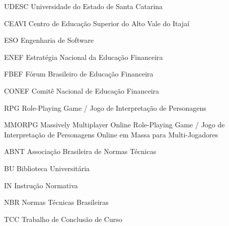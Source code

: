 
\listoffigures*
\cleardoublepage



\listoftables*
\cleardoublepage

\begin{siglas}
	\item[UDESC] Universidade do Estado de Santa Catarina
	\item[CEAVI] Centro de Educação Superior do Alto Vale do Itajaí
	\item[ESO] Engenharia de Software

	\item[ENEF]  Estratégia Nacional da Educação Financeira
	\item[FBEF]  Fórum Brasileiro de Educação Financeira
	\item[CONEF] Comitê Nacional de Educação Financeira
	\item[RPG] Role-Playing Game / Jogo de Interpretação de Personagens
	\item[MMORPG] Massively Multiplayer Online Role-Playing Game / Jogo de Interpretação de Personagens Online em Massa para Multi-Jogadores





	\item[ABNT] Associação Brasileira de Normas Técnicas
	\item[BU] Biblioteca Universitária
	\item[IN] Instrução Normativa
	\item[NBR] Normas Técnicas Brasileiras
	\item[TCC] Trabalho de Conclusão de Curso

\end{siglas}

